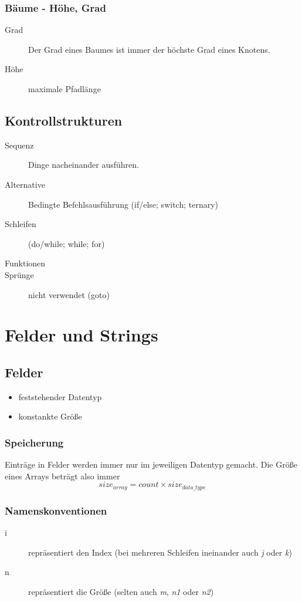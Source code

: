 \documentclass{book}
\begin{document}
\subsection{Bäume - Höhe, Grad}
\begin{description}
	\item[Grad] Der Grad eines Baumes ist immer der höchste Grad eines Knotens.
	\item[Höhe] maximale Pfadlänge
\end{description}
\section{Kontrollstrukturen}
\begin{description}
	\item[Sequenz] Dinge nacheinander ausführen.
	\item[Alternative] Bedingte Befehlsausführung (if/else; switch; ternary)
	\item[Schleifen] (do/while; while; for)   
	\item[Funktionen]
	\item[Sprünge] nicht verwendet (goto) 
\end{description}

\chapter{Felder und Strings}
\section{Felder}
\begin{itemize}
	\item feststehender Datentyp
	\item konstankte Größe
\end{itemize}
\subsection{Speicherung}
Einträge in Felder werden immer nur im jeweiligen Datentyp gemacht. Die Größe eines Arrays beträgt also immer
$$size_{array} = count \times size_{data\_type}$$
\subsection{Namenskonventionen}
\begin{description}
	\item[i] repräsentiert den Index (bei mehreren Schleifen ineinander auch \textit{j} oder \textit{k})
	\item[n] repräsentiert die Größe (selten auch \textit{m}, \textit{n1} oder \textit{n2})  
\end{description}
\end{document}
